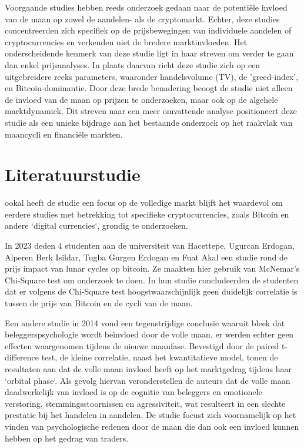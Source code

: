 \documentclass{hogent-article}
\begin{document}
Voorgaande studies hebben reeds onderzoek gedaan naar de potentiële invloed van de maan op zowel de aandelen- als de cryptomarkt. Echter, deze studies concentreerden zich specifiek op de prijsbewegingen van individuele aandelen of cryptocurrencies en verkenden niet de bredere marktinvloeden. Het onderscheidende kenmerk van deze studie ligt in haar streven om verder te gaan dan enkel prijsanalyses. In plaats daarvan richt deze studie zich op een uitgebreidere reeks parameters, waaronder handelsvolume (TV), de 'greed-index', en Bitcoin-dominantie. Door deze brede benadering beoogt de studie niet alleen de invloed van de maan op prijzen te onderzoeken, maar ook op de algehele marktdynamiek. Dit streven naar een meer omvattende analyse positioneert deze studie als een unieke bijdrage aan het bestaande onderzoek op het raakvlak van maancycli en financiële markten.

\section{Literatuurstudie}%
\label{sec:Literatuurstudie}

ookal heeft de studie een focus op de volledige markt blijft het waardevol om eerdere studies met betrekking tot specifieke cryptocurrencies, zoals Bitcoin en andere `digital currencies`, grondig te onderzoeken. 
\newline

In 2023 deden 4 studenten aan de universiteit van Hacettepe, Ugurcan Erdogan, Alperen Berk Isildar, Tugba Gurgen Erdogan en Fuat Akal \textbf{\textcite{Lunarcycles2023}} een studie rond de prijs impact van lunar cycles op bitcoin. Ze maakten hier gebruik van McNemar's Chi-Square test om onderzoek te doen. In hun studie concludeerden de studenten dat er volgens de Chi-Square test hoogstwaarschijnlijk geen duidelijk correlatie is tussen de prijs van Bitcoin en de cycli van de maan.
\newline

Een andere studie in 2014 vond een tegenstrijdige conclusie waaruit bleek dat beleggerspsychologie wordt beïnvloed door de volle maan, er werden echter geen effecten waargenomen tijdens de nieuwe maanfase. Bevestigd door de paired t-difference test, de kleine correlatie, naast het kwantitatieve model, tonen de resultaten aan dat de volle maan invloed heeft op het marktgedrag tijdens haar `orbital phase`. Als gevolg hiervan veronderstellen de auteurs dat de volle maan daadwerkelijk van invloed is op de cognitie van beleggers en emotionele verstoring, stemmingsstoornissen en agressiviteit, wat resulteert in een slechte prestatie bij het handelen in aandelen.
\textbf{\textcite{Brahmana2014}}
De studie focust zich voornamelijk op het vinden van psychologische redenen door de maan die dan ook een invloed kunnen hebben op het gedrag van traders.
\newline
\end{document}
